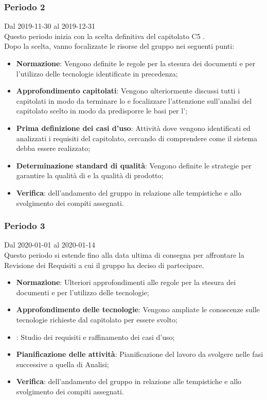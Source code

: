 \subsubsection{Periodo 2} 
Dal 2019-11-30 al 2019-12-31\\
Questo periodo inizia con la scelta definitiva del capitolato C5 \NomeProgetto{}.\\
Dopo la scelta, vanno focalizzate le risorse del gruppo nei seguenti punti:
\begin{itemize}
	\item \textbf{Normazione}: Vengono definite le regole per la stesura dei documenti e per l'utilizzo delle tecnologie identificate in precedenza;
	\item \textbf{Approfondimento capitolati}: Vengono ulteriormente discussi tutti i capitolati in modo da terminare lo \SdF{} e focalizzare l'attenzione sull'analisi del capitolato scelto in modo da predisporre le basi per l'\AdR{};
	\item \textbf{Prima definizione dei casi d'uso}: Attività dove vengono identificati ed analizzati i requisiti del capitolato, cercando di comprendere come il sistema debba essere realizzato;
	\item \textbf{Determinazione standard di qualità}: Vengono definite le strategie per garantire la qualità di  e la qualità di prodotto;
	\item \textbf{Verifica}:  dell'andamento del gruppo in relazione alle tempistiche e allo svolgimento dei compiti assegnati.
\end{itemize}

\subsubsection{Periodo 3}
Dal 2020-01-01 al 2020-01-14\\
Questo periodo si estende fino alla data ultima di consegna per affrontare la Revisione dei Requisiti a cui il gruppo ha deciso di partecipare.
\begin{itemize}
	\item \textbf{Normazione}: Ulteriori approfondimenti alle regole per la stesura dei documenti e per l'utilizzo delle tecnologie;
	\item \textbf{Approfondimento delle tecnologie}: Vengono ampliate le conoscenze sulle tecnologie richieste dal capitolato per essere svolto;
	\item \textbf{\AdR{}}: Studio dei requisiti e raffinamento dei casi d'uso;
	\item \textbf{Pianificazione delle attività}: Pianificazione del lavoro da svolgere nelle fasi successive a quella di Analisi;
	\item \textbf{Verifica}:  dell'andamento del gruppo in relazione alle tempistiche e allo svolgimento dei compiti assegnati.
\end{itemize}

